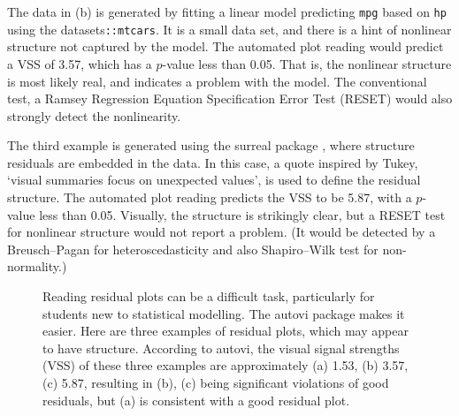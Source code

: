 \documentclass[
doublespace,
  times]{anzsauth}
\begin{document}
The data in (b) is generated by fitting a linear model predicting
\texttt{mpg} based on \texttt{hp} using the
\textsf{datasets}\texttt{::mtcars}. It is a small data set, and there is
a hint of nonlinear structure not captured by the model. The automated
plot reading would predict a VSS of 3.57, which has a \(p\)-value less
than 0.05. That is, the nonlinear structure is most likely real, and
indicates a problem with the model. The conventional test, a Ramsey
Regression Equation Specification Error Test (RESET)
\citep{ramsey1969tests} would also strongly detect the nonlinearity.

The third example is generated using the \textsf{surreal} package
\citep{surreal}, where structure residuals are embedded in the data. In
this case, a quote inspired by Tukey, `visual summaries focus on
unexpected values', is used to define the residual structure. The
automated plot reading predicts the VSS to be 5.87, with a \(p\)-value
less than 0.05. Visually, the structure is strikingly clear, but a RESET
test for nonlinear structure would not report a problem. (It would be
detected by a Breusch--Pagan for heteroscedasticity and also
Shapiro--Wilk test \citep{shapiro1965analysis} for non-normality.)

\begin{figure}


\caption{\label{fig-three-examples}Reading residual plots can be a
difficult task, particularly for students new to statistical modelling.
The \textsf{autovi} package makes it easier. Here are three examples of
residual plots, which may appear to have structure. According to autovi,
the visual signal strengths (VSS) of these three examples are
approximately (a) 1.53, (b) 3.57, (c) 5.87, resulting in (b), (c) being
significant violations of good residuals, but (a) is consistent with a
good residual plot.}

\end{figure}%
\end{document}
